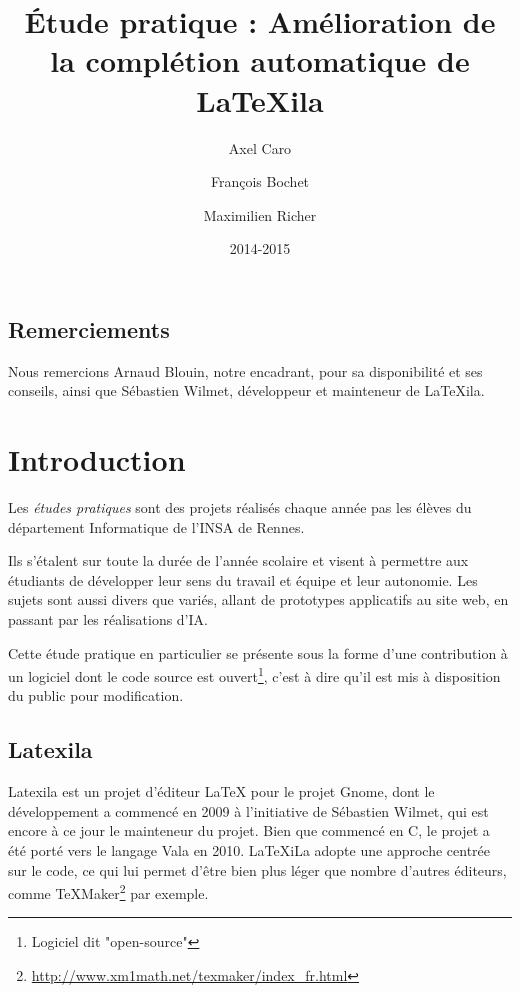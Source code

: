 \documentclass[a4paper,11pt]{report}
\title{Étude pratique : Amélioration de la complétion automatique de \LaTeX{}ila}
\author{Axel Caro\and François Bochet\and Maximilien Richer}
\date{2014-2015}
\begin{document}


\maketitle %
\tableofcontents %
\newpage

\section*{Remerciements} %
\begin{center}
\label{sec:remerciements}
Nous remercions Arnaud Blouin, notre encadrant, pour sa disponibilité et ses conseils, ainsi que Sébastien Wilmet, développeur et mainteneur de LaTeXila.
\end{center}
\vspace{\fill}

\chapter*{Introduction}
\label{cha:Introduction}
Les \textit{études pratiques} sont des projets réalisés chaque année pas les élèves du département Informatique de l'INSA de Rennes.

Ils s'étalent sur toute la durée de l'année scolaire et visent à permettre aux étudiants de développer leur sens du travail et équipe et leur autonomie.
Les sujets sont aussi divers que variés, allant de prototypes applicatifs au site web, en passant par les réalisations d'IA.

Cette étude pratique en particulier se présente sous la forme d'une contribution à un logiciel dont le code source est ouvert\footnote{Logiciel dit "open-source"}, c'est à dire qu'il est mis à disposition du public pour modification.

\section{Latexila}
\label{sec:latexila}
Latexila est un projet d'éditeur LaTeX pour le projet Gnome, dont le développement a commencé en 2009 à l'initiative de Sébastien Wilmet, qui est encore à ce jour le mainteneur du projet.
Bien que commencé en C, le projet a été porté vers le langage Vala en 2010. LaTeXiLa adopte une approche centrée sur le code, ce qui lui permet d'être bien plus léger que nombre d'autres éditeurs, comme TeXMaker\footnote{\url{http://www.xm1math.net/texmaker/index_fr.html}} par exemple.
\end{document}
